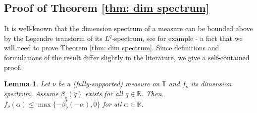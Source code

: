 \documentclass[11pt,reqno]{amsart}
\theoremstyle{plain}
\newtheorem{lemma}[theorem]{Lemma}
\theoremstyle{definition}
\newcommand{\R}{{\mathbb R}}
\newcommand{\TT}{\mathbb{T}}
\begin{document}
\subsection{Proof of Theorem \ref{thm: dim spectrum}}

It is well-known that the dimension spectrum of a measure can be bounded above by the Legendre transform of its $L^q$-spectrum, see for example \cite{LauNgai} - a fact that we will need to prove Theorem \ref{thm: dim spectrum}. Since definitions and formulations of the result differ slightly in the literature, we give a self-contained proof. 

\begin{lemma}
\label{LEM:f-alpha-lq-general}
Let $\nu$ be a (fully-supported) measure on $\TT$ and $f_{\nu}$ its dimension spectrum. Assume $\beta_{\nu}(q)$ exists for all $q \in \R$. Then, $f_{\nu}(\alpha) \leqslant \max\{ - \beta_\nu^{\ast}(-\alpha), 0 \}$ for all $\alpha \in \mathbb{R}$.
\end{lemma}
\end{document}
